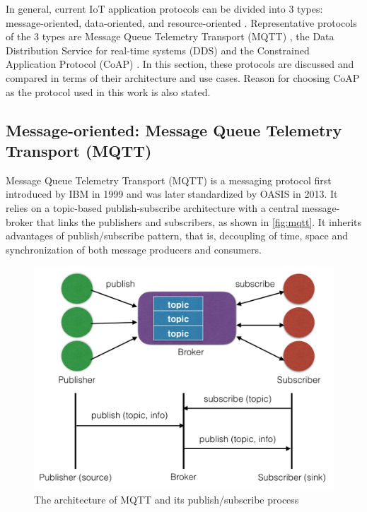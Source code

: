 In general, current IoT application protocols can be divided into 3 types: message-oriented, data-oriented, and resource-oriented \autocite{7396558}. Representative protocols of the 3 types are Message Queue Telemetry Transport (MQTT) \autocite{mqtt_protocol}, the Data Distribution Service for real-time systems (DDS) \autocite{dds} and the Constrained Application Protocol (CoAP) \autocite{coap_protocol}. In this section, these protocols are discussed and compared in terms of their architecture and use cases. Reason for choosing CoAP as the protocol used in this work is also stated. 

\subsection{Message-oriented:  Message Queue Telemetry Transport (MQTT)}

Message Queue Telemetry Transport (MQTT) \autocite{mqtt_protocol} is a messaging protocol first introduced by IBM in 1999 and was later standardized by OASIS in 2013. It relies on a topic-based publish-subscribe architecture with a central message-broker that links the publishers and subscribers, as shown in \autoref{fig:mqtt}. It inherits advantages of publish/subscribe pattern, that is, decoupling of time, space and synchronization of both message producers and consumers. 

\begin{figure}[!htbp]
\centering
\includegraphics[scale = 0.55]{mqtt.png}
\caption{The architecture of MQTT and its publish/subscribe process}
\label{fig:mqtt}
\end{figure}

